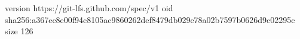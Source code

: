 version https://git-lfs.github.com/spec/v1
oid sha256:a367ec8e00f94c8105ac9860262def8479db029e78a02b7597b0626d9c02295c
size 126
